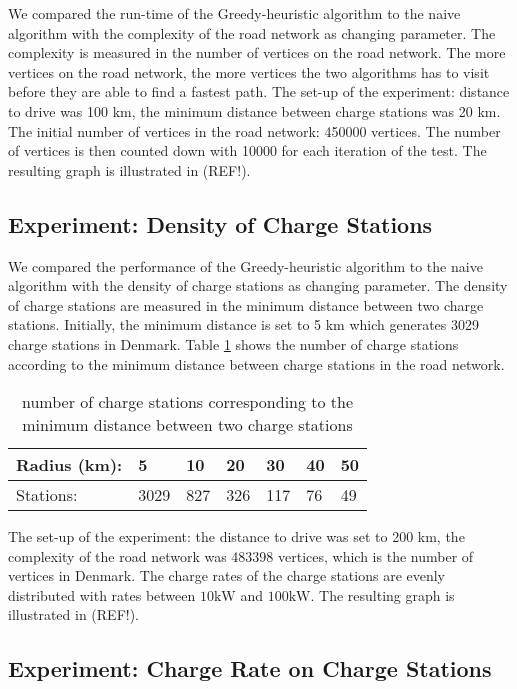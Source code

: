 We compared the run-time of the Greedy-heuristic algorithm to the naive algorithm with the complexity of the road network as changing parameter. The
complexity is measured in the number of vertices on the road network. The more vertices on the road network, the more vertices the two algorithms has 
to visit before they are able to find a fastest path. The set-up of the experiment: distance to drive was 100 km, the minimum distance between 
charge stations was 20 km. The initial number of vertices in the road network: 450000 vertices. The number of vertices is then counted down with 10000 for each iteration of the test. The resulting graph is illustrated in (REF!).

\subsection{Experiment: Density of Charge Stations}

We compared the performance of the Greedy-heuristic algorithm to the naive algorithm with the density of charge stations as changing parameter. The
density of charge stations are measured in the minimum distance between two charge stations. Initially, the minimum distance is set to 5 km which generates 3029 charge stations in Denmark. Table \ref{table:chargedensity} shows the number of charge stations according to the minimum distance between charge stations in the road network.

\begin{table}[!htb]
\centering
		\begin{tabular}{ p{1.85cm} p{0.67cm} p{0.63cm} p{0.63cm} p{0.63cm} p{0.63cm} p{0.63cm} } \hline
		Radius (km): & 5 & 10 & 20 & 30 & 40 & 50 \\ \hline
		Stations: & 3029 & 827 & 326 & 117 & 76 & 49 \\ \hline 
		\end{tabular}
		\caption{number of charge stations corresponding to the minimum distance between two charge stations}
	\label{table:chargedensity}
	\end{table}

The set-up of the experiment: the distance to drive was set to 200 km, the complexity of the road network was 483398 vertices, which is the number of vertices in Denmark. The charge rates of the charge stations are evenly distributed with rates between $10 \si{\kW}$ and $100 \si{\kW}$. The resulting graph is illustrated in (REF!).

\subsection{Experiment: Charge Rate on Charge Stations}

